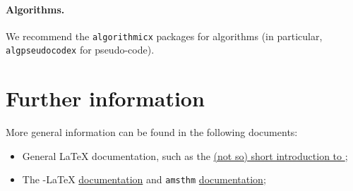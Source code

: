\documentclass{iacrcc}
\begin{document}
\paragraph{Algorithms.}

We recommend the \texttt{algorithmicx} packages for algorithms (in
particular, \texttt{algpseudocodex} for pseudo-code).


\section{Further information}

More general information can be found in the following documents:
\begin{itemize}
\item General \LaTeX{} documentation, such as the
  \href{http://mirrors.ctan.org/info/lshort/english/lshort.pdf}{(not
    so) short introduction to \LaTeXe};
\item The \AmS-\LaTeX{}
  \href{http://mirrors.ctan.org/macros/latex/required/amslatex/math/amsldoc.pdf}{documentation}
  and \texttt{amsthm} \href{ftp://ftp.ams.org/pub/tex/doc/amscls/amsthdoc.pdf}{documentation};
\end{itemize}

\renewcommand{\refname}{Sample References}

\end{document}
